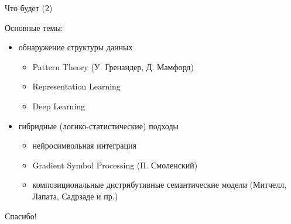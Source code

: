 \documentclass{beamer}
\begin{document}
\begin{frame}{Что будет (2)}
\begin{small}
Основные темы:\\
\medskip
\begin{itemize}
	\item обнаружение структуры данных
	\begin{itemize}
    	\item Pattern Theory (У. Гренандер, Д. Мамфорд)
	    \item Representation Learning
	    \item Deep Learning
	\end{itemize}
	\item гибридные (логико-статистические) подходы
	\begin{itemize}
    	\item нейросимвольная интеграция
	    \item Gradient Symbol Processing (П. Смоленский)
	    \item композициональные дистрибутивные семантические модели (Митчелл, Лапата, Садрзаде и пр.)
	\end{itemize}
\end{itemize}
\end{small}
\end{frame}


\begin{frame}{}
    \thispagestyle{empty}
    \begin{center}
        {\large Спасибо!}
    \end{center}
\end{frame}


\end{document}
